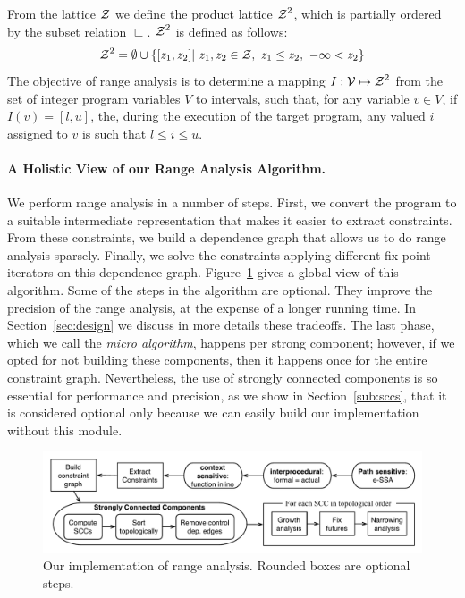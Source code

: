 \documentclass{paper}
\newcommand{\varset}[1]{\mbox{$\cal{#1}$}}
\begin{document}
From the lattice $\varset{Z}$ we define the product lattice
$\varset{Z}^2$, which is partially ordered by the subset relation
$\sqsubseteq$.
$\varset{Z}^2$ is defined as follows:
%
\begin{equation*}
\varset{Z}^2 = \emptyset \cup \{[z_1, z_2] | \ z_1,z_2 \in \varset{Z},
\ z_1 \leq z_2, \  -\infty < z_2 \}
\end{equation*}
%
The objective of range analysis is to determine a mapping
$I: \varset{V} \mapsto \varset{Z}^2$ from the set of integer program variables
$V$ to intervals, such that, for any variable $v \in V$, if
$I(v) = [l, u]$, the, during the execution of the target program, any
valued $i$ assigned to $v$ is such that $l \leq i \leq u$.

\paragraph{A Holistic View of our Range Analysis Algorithm.}
We perform range analysis in a number of steps.
First, we convert the program to a suitable intermediate representation that
makes it easier to extract constraints.
From these constraints, we build a dependence graph that allows us to do
range analysis sparsely.
Finally, we solve the constraints applying different fix-point iterators on
this dependence graph.
Figure~\ref{fig:algorithm} gives a global view of this algorithm.
Some of the steps in the algorithm are optional.
They improve the precision of the range analysis, at the expense of a longer
running time.
In Section~\ref{sec:design} we discuss in more details these tradeoffs.
The last phase, which we call the {\em micro algorithm}, happens per
strong component; however, if we opted for not building these components,
then it happens once for the entire constraint graph.
Nevertheless, the use of strongly connected components
is so essential for performance and precision, as we show in
Section~\ref{sub:sccs}, that it is considered optional only because we
can easily build our implementation without this module.

\begin{figure}[t!]
\begin{center}
\includegraphics[width=\textwidth]{images/algorithm}
\end{center}
\caption{\label{fig:algorithm}
Our implementation of range analysis. Rounded boxes are optional steps.}
\end{figure}
\end{document}
